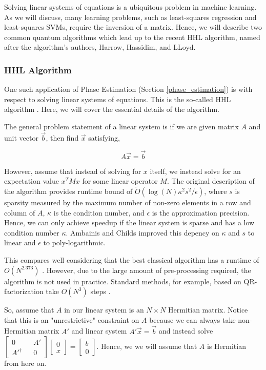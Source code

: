 \documentclass[main.tex]{subfiles}
\begin{document}
Solving linear systems of equations is a ubiquitous problem in machine learning. As we will discuss, many learning problems, such as least-squares regression and least-squares SVMs, require the inversion of a matrix. Hence, we will describe two common quantum algorithms which lead up to the recent HHL algorithm, named after the algorithm's authors, Harrow, Hassidim, and LLoyd.

\subsubsection{HHL Algorithm}

One such application of Phase Estimation (Section \ref{phase_estimation}) is with respect to solving linear systems of equations. This is the so-called HHL algorithm \cite{lloyd2010quantum}. Here, we will cover the essential details of the algorithm.

The general problem statement of a linear system is if we are given matrix $A$ and unit vector $\vec{b}$, then find $\vec{x}$ satisfying, 

$$A\vec{x} = \vec{b}$$ 

However, assume that instead of solving for $x$ itself, we instead solve for an expectation value $x^T M x$ for some linear operator $M$. The original description of the algorithm provides runtime bound of $\tilde{O}(\log(N)\kappa ^{2} s^2 / \epsilon)$, where $s$ is sparsity measured by the maximum number of non-zero elements in a row and column of $A$, $\kappa$ is the condition number, and $\epsilon$ is the approximation precision. Hence, we can only achieve speedup if the linear system is sparse and has a low condition number $\kappa$. Ambainis \cite{ambainis2012variable} and Childs \cite{childs2015quantum} improved this depency on $\kappa$ and $s$ to linear and $\epsilon$ to poly-logarithmic.

This compares well considering that the best classical algorithm has a runtime of $O(N^{2.373})$ \cite{coppersmith1987matrix}. However, due to the large amount of pre-processing required, the algorithm is not used in practice. Standard methods, for example, based on QR-factorization take $O(N^3)$ steps \cite{golub2012matrix}. 

So, assume that $A$ in our linear system is an $N \times N$ Hermitian matrix. Notice that this is an "unrestrictive" constraint on $A$ because we can always take non-Hermitian matrix $A'$ and linear system $A' \vec{x} = \vec{b}$ and instead solve $\begin{bmatrix}
	0 && A' \\ A'^\dag && 0
\end{bmatrix} \begin{bmatrix} 0 \\ x \end{bmatrix} = \begin{bmatrix} b \\ 0 \end{bmatrix}$. Hence, we we will assume that $A$ is Hermitian from here on. 
\end{document}
